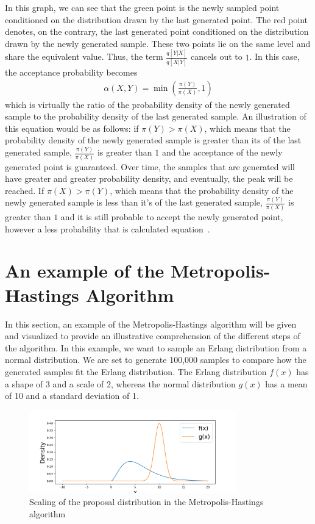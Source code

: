 In this graph, we can see that the green point is the newly sampled point conditioned on the distribution drawn by the last generated point. The red point denotes, on the contrary, the last generated point conditioned on the distribution drawn by the newly generated sample. These two points lie on the same level and share the equivalent value. Thus, the term $\frac{q[Y|X]}{q[X|Y]}$ cancels out to $1$. In this case, the acceptance probability becomes
\begin{align}
\alpha(X, Y) = \min (\frac{\pi(Y)}{\pi(X)}, 1)
\end{align}
which is virtually the ratio of the probability density of the newly generated sample to the probability density of the last generated sample. An illustration of this equation would be as follows: if $\pi(Y) > \pi(X)$, which means that the probability density of the newly generated sample is greater than its of the last generated sample, $\frac{\pi(Y)}{\pi(X)}$ is greater than $1$ and the acceptance of the newly generated point is guaranteed. Over time, the samples that are generated will have greater and greater probability density, and eventually, the peak will be reached. If $\pi(X) > \pi(Y)$, which means that the probability density of the newly generated sample is less than it's of the last generated sample, $\frac{\pi(Y)}{\pi(X)}$ is greater than $1$ and it is still probable to accept the newly generated point, however a less probability that is calculated equation~\cite{understanding_mh}.

\section{An example of the Metropolis-Hastings Algorithm}
In this section, an example of the Metropolis-Hastings algorithm will be given and visualized to provide an illustrative comprehension of the different steps of the algorithm. In this example, we want to sample an Erlang distribution from a normal distribution. We are set to generate 100,000 samples to compare how the generated samples fit the Erlang distribution. The Erlang distribution $f(x)$ has a shape of 3 and a scale of 2, whereas the normal distribution $g(x)$ has a mean of 10 and a standard deviation of 1.

\begin{figure}[H]
    \centering
    \includegraphics[width=0.8\textwidth]{figures/mcmc_example/first_step.png}
    \captionsetup{width=.8\textwidth}
    \caption{Scaling of the proposal distribution in the Metropolis-Hastings algorithm}
    \label{fig:enter-label}
\end{figure}


